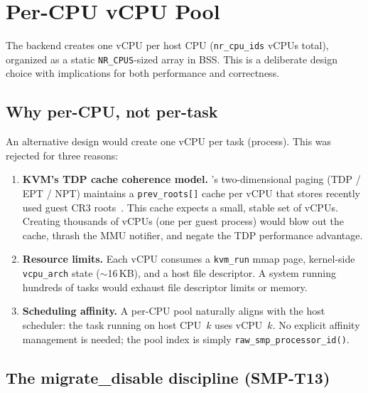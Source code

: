 \section{Per-CPU vCPU Pool}
\label{sec:kvm-vcpu-pool}

The \KVMvTwo{} backend creates one \KVM{} vCPU per host CPU
(\texttt{nr\_cpu\_ids} vCPUs total), organized as a static
\texttt{NR\_CPUS}-sized array in BSS.  This is a deliberate design choice
with implications for both performance and correctness.

\subsection{Why per-CPU, not per-task}

An alternative design would create one vCPU per \UML{} task (process).
This was rejected for three reasons:

\begin{enumerate}[leftmargin=2em]
  \item \textbf{KVM's TDP cache coherence model.}
    \KVM{}'s two-dimensional paging (TDP / EPT / NPT) maintains a
    \texttt{prev\_roots[]} cache per vCPU that stores recently used
    guest CR3 roots~\cite{intel-sdm}.  This cache expects a small, stable
    set of vCPUs.  Creating thousands of vCPUs (one per guest process)
    would blow out the cache, thrash the MMU notifier, and negate the
    TDP performance advantage.

  \item \textbf{Resource limits.}
    Each vCPU consumes a \texttt{kvm\_run} mmap page, kernel-side
    \texttt{vcpu\_arch} state ($\sim$16\,KB), and a host file descriptor.
    A system running hundreds of \UML{} tasks would exhaust file descriptor
    limits or memory.

  \item \textbf{Scheduling affinity.}
    A per-CPU pool naturally aligns with the host scheduler: the \UML{} task
    running on host CPU~$k$ uses vCPU~$k$.  No explicit affinity management
    is needed; the pool index is simply \texttt{raw\_smp\_processor\_id()}.
\end{enumerate}

\subsection{The migrate\_disable discipline (SMP-T13)}

